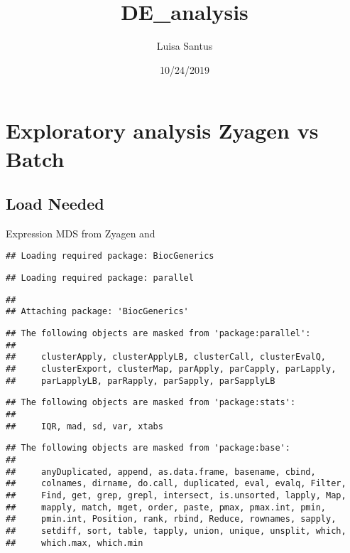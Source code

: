 \documentclass[]{article}
\title{DE\_analysis}
\author{Luisa Santus}
\date{10/24/2019}
\begin{document}
\maketitle

\hypertarget{exploratory-analysis-zyagen-vs-batch}{%
\section{Exploratory analysis Zyagen vs
Batch}\label{exploratory-analysis-zyagen-vs-batch}}

\hypertarget{load-needed}{%
\subsection{Load Needed}\label{load-needed}}

Expression MDS from Zyagen and

\begin{verbatim}
## Loading required package: BiocGenerics
\end{verbatim}

\begin{verbatim}
## Loading required package: parallel
\end{verbatim}

\begin{verbatim}
## 
## Attaching package: 'BiocGenerics'
\end{verbatim}

\begin{verbatim}
## The following objects are masked from 'package:parallel':
## 
##     clusterApply, clusterApplyLB, clusterCall, clusterEvalQ,
##     clusterExport, clusterMap, parApply, parCapply, parLapply,
##     parLapplyLB, parRapply, parSapply, parSapplyLB
\end{verbatim}

\begin{verbatim}
## The following objects are masked from 'package:stats':
## 
##     IQR, mad, sd, var, xtabs
\end{verbatim}

\begin{verbatim}
## The following objects are masked from 'package:base':
## 
##     anyDuplicated, append, as.data.frame, basename, cbind,
##     colnames, dirname, do.call, duplicated, eval, evalq, Filter,
##     Find, get, grep, grepl, intersect, is.unsorted, lapply, Map,
##     mapply, match, mget, order, paste, pmax, pmax.int, pmin,
##     pmin.int, Position, rank, rbind, Reduce, rownames, sapply,
##     setdiff, sort, table, tapply, union, unique, unsplit, which,
##     which.max, which.min
\end{verbatim}
\end{document}
